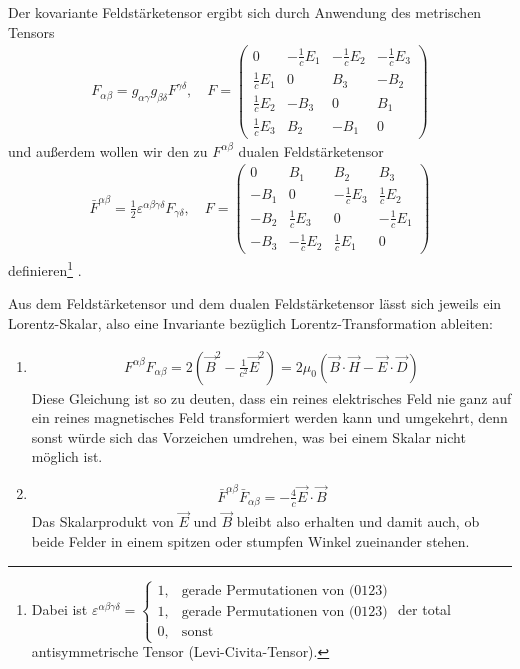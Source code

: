 Der kovariante Feldstärketensor ergibt sich durch Anwendung des metrischen Tensors
\begin{align*}
    F_{\alpha\beta} = g_{\alpha\gamma}g_{\beta\delta} F^{\gamma\delta}, \quad
    F=\begin{pmatrix}
          0              & -\frac{1}{c}E_1 & -\frac{1}{c}E_2 & -\frac{1}{c}E_3 \\
          \frac{1}{c}E_1 & 0               & B_3             & -B_2            \\
          \frac{1}{c}E_2 & -B_3            & 0               & B_1             \\
          \frac{1}{c}E_3 & B_2             & -B_1            & 0
      \end{pmatrix}
\end{align*}
und außerdem wollen wir den zu $F^{\alpha\beta}$ dualen Feldstärketensor
\begin{align*}
    \bar F^{\alpha\beta} = \frac{1}{2} \varepsilon^{\alpha\beta\gamma\delta} F_{\gamma\delta}, \quad
    F=\begin{pmatrix}
          0    & B_1             & B_2             & B_3             \\
          -B_1 & 0               & -\frac{1}{c}E_3 & \frac{1}{c}E_2  \\
          -B_2 & \frac{1}{c}E_3  & 0               & -\frac{1}{c}E_1 \\
          -B_3 & -\frac{1}{c}E_2 & \frac{1}{c}E_1  & 0
      \end{pmatrix}
\end{align*}
definieren\footnote{Dabei ist $\varepsilon^{\alpha\beta\gamma\delta}=\begin{cases}1,&\text{gerade Permutationen von (0123)}\\1,&\text{gerade Permutationen von (0123)}\\0,& \mathrm{sonst}\end{cases}$ der total antisymmetrische Tensor (Levi-Civita-Tensor).}  . 

Aus dem Feldstärketensor und dem dualen Feldstärketensor lässt sich jeweils ein Lorentz-Skalar, also eine Invariante bezüglich Lorentz-Transformation ableiten:
\begin{enumerate}
    \item \begin{align*}
        F^{\alpha\beta}F_{\alpha\beta}=2\left(\vec B^2-\frac{1}{c^2}\vec E^2\right) = 2\mu_0(\vec B\cdot\vec H-\vec E\cdot\vec D)
    \end{align*}
    Diese Gleichung ist so zu deuten, dass ein reines elektrisches Feld nie ganz auf ein reines magnetisches Feld transformiert werden kann und umgekehrt, denn sonst würde sich das Vorzeichen umdrehen, was bei einem Skalar nicht möglich ist. 
    \item \begin{align*}
        \bar F^{\alpha\beta}\bar F_{\alpha\beta}=-\frac{4}{c}\vec E\cdot \vec B
    \end{align*}
    Das Skalarprodukt von $\vec E$ und $\vec B$ bleibt also erhalten und damit auch, ob beide Felder in einem spitzen oder stumpfen Winkel zueinander stehen. 
\end{enumerate}



